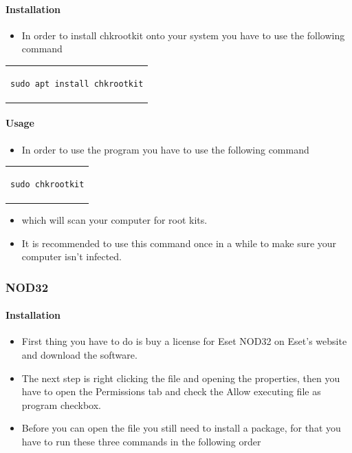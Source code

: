 \documentclass[a4paper,10pt]{article}
\begin{document}
\paragraph{Installation}

\begin{itemize}[leftmargin=*]
\item In order to install chkrootkit onto your system you have to use the following command
\end{itemize}

\begin{center}
\begin{tabular}{c}
\begin{lstlisting}
sudo apt install chkrootkit
\end{lstlisting}
\end{tabular}
\end{center}

\paragraph{Usage}
\begin{itemize}[leftmargin=*]
\item In order to use the program you have to use the following command
\end{itemize}

\begin{center}
\begin{tabular}{c}
\begin{lstlisting}
sudo chkrootkit
\end{lstlisting}
\end{tabular}
\end{center}


\begin{itemize}[leftmargin=*]
\item which will scan your computer for root kits. 
\item It is recommended to use this command once in a while to make sure your computer isn't infected.
\end{itemize}


\subsubsection{NOD32}
\paragraph{Installation}

\begin{itemize}[leftmargin=*]
\item First thing you have to do is buy a license for Eset NOD32 on Eset's website and download the software.
\item The next step is right clicking the file and opening the properties, then you have to open the Permissions tab and check the Allow executing file as program checkbox.
\item Before you can open the file you still need to install a package, for that you have to run these three commands in the following order
\end{itemize}
\end{document}
